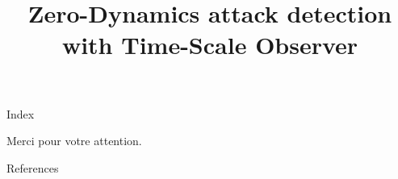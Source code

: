 \documentclass[ieee,english]{slides}
\title{Zero-Dynamics attack detection with Time-Scale Observer}
\begin{document}
\maketitle{}

\begin{slide}{Index}
  \begin{minipage}[t][0.4\textheight][t]{0.45\textwidth}
    \tableofcontents[sections={1-4}]
  \end{minipage}
  \begin{minipage}[t][0.4\baselineskip][t]{0.45\textwidth}
    \tableofcontents[sections={5-}]
  \end{minipage}
  \vfill\null{}
\end{slide}







\begin{slide}{}
  \vspace*{\fill}
  \begin{center}
    \textcolor{fg}{\Large{Merci pour votre attention.}}
  \end{center}
  \vspace*{\fill}
\end{slide}

\begin{slide}[allowframebreaks]{References}
  \nocite{*}
  \printbibliography{}
\end{slide}
\end{document}
